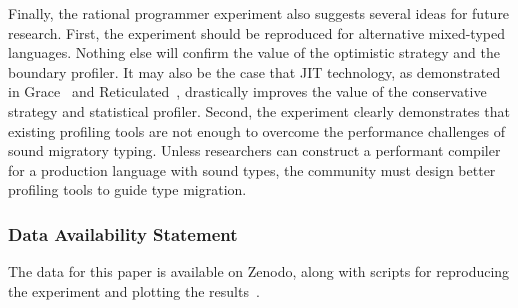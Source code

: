 Finally, the rational programmer experiment also suggests several ideas for
future research. First, the experiment should be reproduced for alternative
mixed-typed languages. Nothing else will confirm the value of the optimistic
strategy and the boundary profiler.
It may also be the case that JIT technology, as demonstrated
in Grace~\cite{rmhn-ecoop-2019} and Reticulated~\cite{vsc-dls-2019}, drastically improves the value
of the conservative strategy and statistical profiler.
Second, the
experiment clearly demonstrates that existing profiling tools are not enough to
overcome the performance challenges of sound migratory typing. Unless researchers
can construct a performant compiler for a production language with sound
types, the community must design better profiling tools to guide
type migration.











\subsubsection*{Data Availability Statement}

The data for this paper is available on Zenodo,
along with scripts for reproducing the experiment
and plotting the results~\cite{gdf-artifact-2023}.

